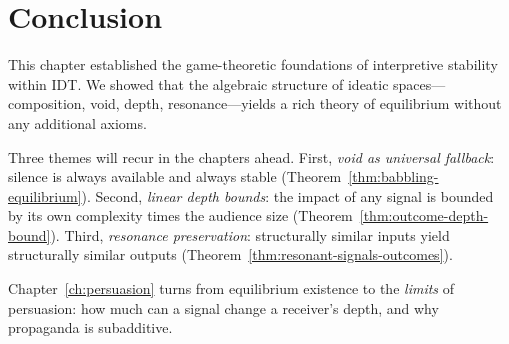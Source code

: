 \section{Conclusion}
\label{sec:eq-conclusion}

This chapter established the game-theoretic foundations of interpretive
stability within IDT\@.  We showed that the algebraic structure of ideatic
spaces---composition, void, depth, resonance---yields a rich theory of
equilibrium without any additional axioms.

Three themes will recur in the chapters ahead.  First, \emph{void as
universal fallback}: silence is always available and always stable
(Theorem~\ref{thm:babbling-equilibrium}).  Second, \emph{linear depth
bounds}: the impact of any signal is bounded by its own complexity times
the audience size (Theorem~\ref{thm:outcome-depth-bound}).  Third,
\emph{resonance preservation}: structurally similar inputs yield
structurally similar outputs
(Theorem~\ref{thm:resonant-signals-outcomes}).

Chapter~\ref{ch:persuasion} turns from equilibrium existence to the
\emph{limits} of persuasion: how much can a signal change a receiver's
depth, and why propaganda is subadditive.
